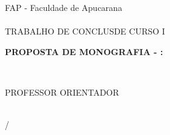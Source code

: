 
\begin{titlepage}
\label{pro:capa}
  \begin{center}
    FAP - Faculdade de Apucarana\\
    \Curso\\
    TRABALHO DE CONCLUS\AO DE CURSO I\\
    \vfill

    \textbf{PROPOSTA DE MONOGRAFIA - \NOME: \ASSUNTO}\\
    \vfill

    \AUTOR\\
    \vfill

    PROFESSOR ORIENTADOR\\
    \ORIENTADOR\\
    \vfill

    \begin{espacosimples}
      {\LOCAL}/{\DATA}
    \end{espacosimples}
  \end{center}
\end{titlepage}
